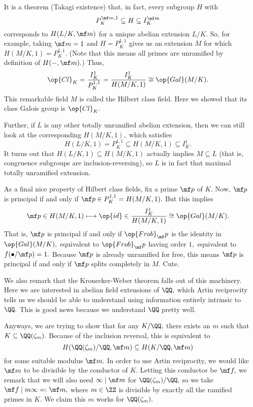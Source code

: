 It is a theorem (Takagi existence) that, in fact, every subgroup $H$ with
\[P_K^{\mf m,1}\subseteq H\subseteq I_K^{\mf m}\]
corresponds to $H(L/K,\mf m)$ for a unique abelian extension $L/K.$ So, for example, taking $\mf m=1$ and $H=P_K^{1,1}$ gives us an extension $M$ for which $H(M/K,1)=P_K^{1,1}.$ (Note that this means all primes are unramified by definition of $H(-,\mf m).$) Thus,
\[\op{Cl}_K=\frac{I_K^1}{P_K^{1,1}}=\frac{I_K^1}{H(M/K,1)}\cong\op{Gal}(M/K).\]
This remarkable field $M$ is called the Hilbert class field. Here we showed that its class Galois group is $\op{Cl}_K.$

Further, if $L$ is any other totally unramified abelian extension, then we can still look at the corresponding $H(M/K,1),$ which satisfies
\[H(L/K,1)=P_K^{1,1}\subseteq H(M/K,1)\subseteq I_K^1.\]
It turns out that $H(L/K,1)\subseteq H(M/K,1)$ actually implies $M\subseteq L$ (that is, congruence subgroups are inclusion-reversing), so $L$ is in fact that maximal totally unramified extension.

As a final nice property of Hilbert class fields, fix a prime $\mf p$ of $K.$ Now, $\mf p$ is principal if and only if $\mf p\in P_K^{1,1}=H(M/K,1).$ But this implies
\[\mf p\in H(M/K,1)\longmapsto\op{id}\in\frac{I_K^1}{H(M/K,1)}\cong\op{Gal}(M/K).\]
That is, $\mf p$ is principal if and only if $\op{Frob}_\mf p$ is the identity in $\op{Gal}(M/K),$ equivalent to $\op{Frob}_\mf p$ having order $1,$ equivalent to $f(\bullet/\mf p)=1.$ Because $\mf p$ is already unramified for free, this means $\mf p$ is principal if and only if $\mf p$ splits completely in $M.$ Cute.

We also remark that the Kronecker-Weber theorem falls out of this machinery. Here we are interested in abelian field extensions of $\QQ,$ which Artin reciprocity tells us we should be able to understand using information entirely intrinsic to $\QQ.$ This is good news because we understand $\QQ$ pretty well.

Anyways, we are trying to show that for any $K/\QQ,$ there exists an $m$ such that $K\subseteq\QQ(\zeta_m).$ Because of the inclusion reversal, this is equivalent to
\[H(\QQ(\zeta_m)/\QQ,\mf m)\subseteq H(K/\QQ,\mf m)\]
for some suitable modulus $\mf m.$ In order to use Artin reciprocity, we would like $\mf m$ to be divisible by the conductor of $K.$ Letting this conductor be $\mf f,$ we remark that we will also need $\infty\mid\mf m$ for $\QQ(\zeta_m)/\QQ,$ so we take $\mf f\mid m\infty=:\mf m,$ where $m\in\ZZ$ is divisible by exactly all the ramified primes in $K.$ We claim this $m$ works for $\QQ(\zeta_m).$


